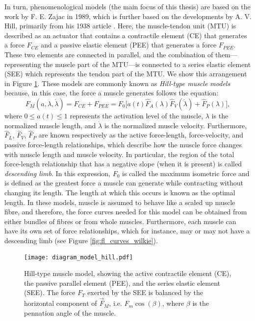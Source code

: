 \documentclass{sfuthesis}
\numberwithin{equation}{section}
\numberwithin{figure}{chapter}
\numberwithin{table}{chapter}
\theoremstyle{definition}
\begin{document}
In turn, phenomenological models (the main focus of this thesis) are based on the work by F. E. Zajac \cite{Zajac1989} in 1989, which is further based on the developments by A. V. Hill, primarily from his 1938 article \cite{Hill1938}. Here, the muscle-tendon unit (MTU) is described as an actuator that contains a contractile element (CE) that generates a force $F_{CE}$ and a passive elastic element (PEE) that generates a force $F_{PEE}$. These two elements are connected in parallel, and the combination of them---representing the muscle part of the MTU---is connected to a series elastic element (SEE) which represents the tendon part of the MTU. We show this arrangement in Figure \ref{fig:diagram_hill}. These models are commonly known as \textit{Hill-type muscle models} because, in this case, the force a muscle generates follows the equation:
\begin{equation} \label{eq:hill_in_intro}
    F_M(a,\lambda,\dot{\lambda}) = F_{CE} + F_{PEE} = F_0  \Big[ a(t) \widehat{F}_A(\lambda) \widehat{F}_V(\dot{\lambda}) + \widehat{F}_P(\lambda) \Big], 
\end{equation}
where $0 \leq a(t) \leq 1$ represents the activation level of the muscle, $\lambda$ is the normalized muscle length, and $\dot{\lambda}$ is the normalized muscle velocity. Furthermore, $\widehat{F}_L$, $\widehat{F}_V$, $\widehat{F}_P$ are known respectively as the active force-length, force-velocity, and passive force-length relationships, which describe how the muscle force changes with muscle length and muscle velocity.
In particular, the region of the total force-length relationship that has a negative slope (when it is present) is called \textit{descending limb}. 
In this expression, $F_0$ is called the maximum isometric force and is defined as the greatest force a muscle can generate while contracting without changing its length. The length at which this occurs is known as the optimal length. In these models, muscle is assumed to behave like a scaled up muscle fibre, and therefore, the force curves needed for this model can be obtained from either bundles of fibres or from whole muscles. Furthermore, each muscle can have its own set of force relationships, which for instance, may or may not have a descending limb (see Figure \ref{fig:fl_curves_wilkie}).


\begin{figure}
    \centering
    \texttt{[image: diagram\_model\_hill.pdf]}
    \caption{Hill-type muscle model, showing the active contractile element (CE), the passive parallel element (PEE), and the series elastic element (SEE). The force $F_T$ exerted by the SEE is balanced by the horizontal component of $\vec{F}_M$, i.e. $F_m \cos(\beta)$, where $\beta$ is the pennation angle of the muscle.\label{fig:diagram_hill}}
\end{figure}
\end{document}
